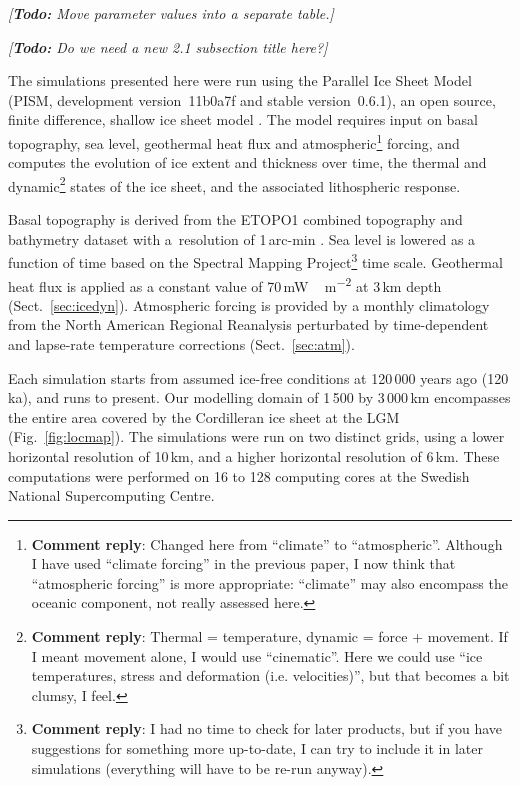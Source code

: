 \documentclass[tc, manuscript]{copernicus}
\newcommand{\renote}[1]{\footnote{\textbf{Comment reply}: #1}}
\newcommand{\todo}[1]{\emph{[\textbf{Todo:} #1]}}
\begin{document}
\todo{Move parameter values into a separate table.}

\noindent\todo{Do we need a new 2.1 subsection title here?}

The simulations presented here were run using the Parallel Ice Sheet Model
(PISM, development version~11b0a7f and stable version~0.6.1), an open source,
finite difference, shallow ice sheet model \citep{PISM-authors.2014}. The model
requires input on basal topography, sea level, geothermal heat flux and
atmospheric\renote{
    Changed here from ``climate'' to ``atmospheric''. Although I have used
    ``climate forcing'' in the previous paper, I now think that ``atmospheric
    forcing'' is more appropriate: ``climate'' may also encompass the oceanic
    component, not really assessed here.}
forcing, and computes the evolution of ice extent
and thickness over time, the thermal and dynamic\renote{
    Thermal = temperature, dynamic = force + movement. If I meant movement
    alone, I would use ``cinematic''. Here we could use ``ice temperatures,
    stress and deformation (i.e. velocities)'', but that becomes a bit clumsy,
    I feel.}
states of the ice sheet, and the associated lithospheric response.

Basal topography is derived from the ETOPO1 combined topography and bathymetry
dataset with a~resolution of 1\,arc-min \citep{Amante.Eakins.2009}. Sea level
is lowered as a function of time based on the Spectral Mapping Project\renote{
    I had no time to check for later products, but if you have suggestions for
    something more up-to-date, I can try to include it in later simulations
    (everything will have to be re-run anyway).}
\citep[SPECMAP;][]{Imbrie.etal.1989} time scale. Geothermal heat flux
is applied as a constant value of 70\,\unit{mW\,m^{-2}} at 3\,km depth
(Sect.~\ref{sec:icedyn}). Atmospheric forcing is provided by a monthly
climatology from the North American Regional Reanalysis
\citep[NARR;][]{Mesinger.etal.2006} perturbated by time-dependent and
lapse-rate temperature corrections (Sect.~\ref{sec:atm}).

Each simulation starts from assumed ice-free conditions at 120\,000 years ago
(120\,ka), and runs to present. Our modelling domain of 1\,500 by 3\,000\,km
encompasses the entire area covered by the Cordilleran ice sheet at the LGM
(Fig.~\ref{fig:locmap}). The simulations were run on two distinct grids, using
a lower horizontal resolution of 10\,km, and a higher horizontal resolution of
6\,km. These computations were performed on 16 to 128 computing cores at the
Swedish National Supercomputing Centre.
\end{document}
